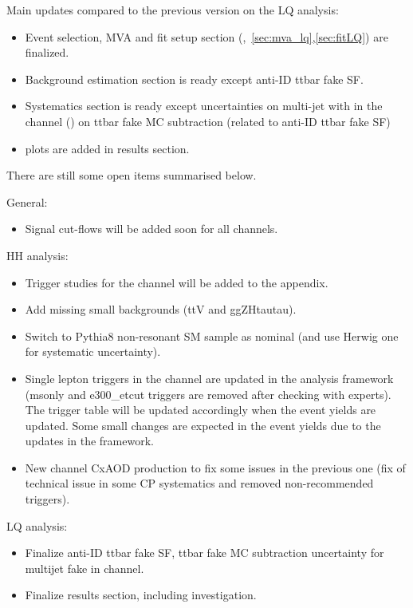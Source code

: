 Main updates compared to the previous version on the LQ analysis:

\begin{itemize}
\item Event selection, MVA and fit setup section (,~\ref{sec:mva_lq},\ref{sec:fitLQ}) are finalized.
\item Background estimation section is ready except anti-ID ttbar fake SF.
\item Systematics section is ready except uncertainties on multi-jet with \tauhad in the \hadhad channel ()
      on ttbar fake MC subtraction (related to anti-ID ttbar fake SF)
\item plots are added in results section.
\end{itemize}

There are still some open items summarised below.

General:

\begin{itemize}
\item Signal cut-flows will be added soon for all channels.
\end{itemize}

HH analysis:

\begin{itemize}
\item Trigger studies for the \hadhad channel will be added to the appendix.
\item Add missing small backgrounds (ttV and ggZHtautau).
\item Switch to Pythia8 non-resonant SM sample as nominal (and use Herwig one for systematic uncertainty).
\item Single lepton triggers in the \lephad channel are updated in the analysis framework (msonly and e300\_etcut triggers are removed after checking with experts). The trigger table will be updated accordingly when the event yields are updated. Some small changes are expected in the \lephad event yields due to the updates in the framework.
\item New \lephad channel CxAOD production to fix some issues in the previous one (fix of technical issue in some CP systematics and removed non-recommended triggers).
\end{itemize}

LQ analysis:

\begin{itemize}
\item Finalize anti-ID ttbar fake SF, ttbar fake MC subtraction uncertainty for multijet fake in \hadhad channel.
\item Finalize results section, including investigation.
\end{itemize}


